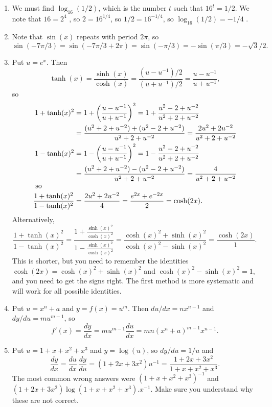 \documentclass{amsart}
\renewcommand{\:}       {\colon}
\newcommand{\mks}[1]    {}
\newcommand{\mk}        {}
\begin{document}
\begin{enumerate}
 \item %
  We must find $\log_{16}(1/2)$, which is the number $t$ such that
  $16^t=1/2$.  We note that $16=2^4$ \mk, so $2=16^{1/4}$, so
  $1/2=16^{-1/4}$, so $\log_{16}(1/2)=-1/4$ \mk.

 \item %
  Note that $\sin(x)$ repeats with period $2\pi$, so
  \[ \sin(-7\pi/3) = \sin(-7\pi/3+2\pi) = \sin(-\pi/3) \mk
      = -\sin(\pi/3) = -\sqrt{3}/2 \mk.
  \]

 \item %
  Put $u=e^x$.  Then 
  \[ \tanh(x) = \frac{\sinh(x)}{\cosh(x)} = 
      \frac{(u-u^{-1})/2}{(u+u^{-1})/2} = \frac{u-u^{-1}}{u+u^{-1}}, \mks{2}
  \]
  so
  \begin{align*}
   1+\tanh(x)^2 &= 
    1 + \left(\frac{u-u^{-1}}{u+u^{-1}}\right)^2 = 
    1 + \frac{u^2-2+u^{-2}}{u^2+2+u^{-2}} \\
    &= \frac{(u^2+2+u^{-2})+(u^2-2+u^{-2})}{u^2+2+u^{-2}} = 
       \frac{2u^2+2u^{-2}}{u^2+2+u^{-2}} \mks{2} \\
   1-\tanh(x)^2 &= 
    1 - \left(\frac{u-u^{-1}}{u+u^{-1}}\right)^2 = 
    1 - \frac{u^2-2+u^{-2}}{u^2+2+u^{-2}} \\
    &= \frac{(u^2+2+u^{-2})-(u^2-2+u^{-2})}{u^2+2+u^{-2}} = 
       \frac{4}{u^2+2+u^{-2}} \mk \\
\intertext{ so }
   \frac{1+\tanh(x)^2}{1-\tanh(x)^2} &= 
    \frac{2u^2+2u^{-2}}{4} = \frac{e^{2x}+e^{-2x}}{2} = \cosh(2x) \mk.
  \end{align*}
  Alternatively,
  \[ \frac{1+\tanh(x)^2}{1-\tanh(x)^2} = 
      \frac{1+\frac{\sinh(x)^2}{\cosh(x)^2}}
           {1-\frac{\sinh(x)^2}{\cosh(x)^2}} = 
      \frac{\cosh(x)^2+\sinh(x)^2}
           {\cosh(x)^2-\sinh(x)^2} = 
      \frac{\cosh(2x)}{1}.
  \]
  This is shorter, but you need to remember the identities
  $\cosh(2x)=\cosh(x)^2+\sinh(x)^2$ and $\cosh(x)^2-\sinh(x)^2=1$, and
  you need to get the signs right.  The first method is more
  systematic and will work for all possible identities.

 \item %
  Put $u=x^n+a$ and $y=f(x)=u^m$.  Then $du/dx=nx^{n-1}$ and
  $dy/du=mu^{m-1}$, so 
  \[ f'(x) = \frac{dy}{dx} = mu^{m-1}\frac{du}{dx} = 
      mn(x^n+a)^{m-1}x^{n-1}. \mks{2}
  \]
 
 \item %
  Put $u=1+x+x^2+x^3$ and $y=\log(u)$, so $dy/du=1/u$ and
  \[ \frac{dy}{dx} = 
     \frac{du}{dx}\,\frac{dy}{du} = 
     (1+2x+3x^2)u^{-1} = \frac{1+2x+3x^2}{1+x+x^2+x^3} \mks{2}.
  \]
  The most common wrong answers were $(1+x+x^2+x^3)^{-1}$ and
  $(1+2x+3x^2)\log(1+x+x^2+x^3).x^{-1}$.  Make sure you understand why
  these are not correct.


\end{enumerate}
\end{document}
